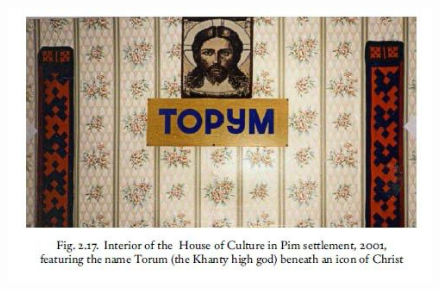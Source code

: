 \documentclass[a4paper, 12pt]{article}
\begin{document}
\printglossaries
	
\printbibliography

	\begin{figure}[H]
		\centering
		\includegraphics[scale=.66]{end}
	\end{figure}
\end{document}

